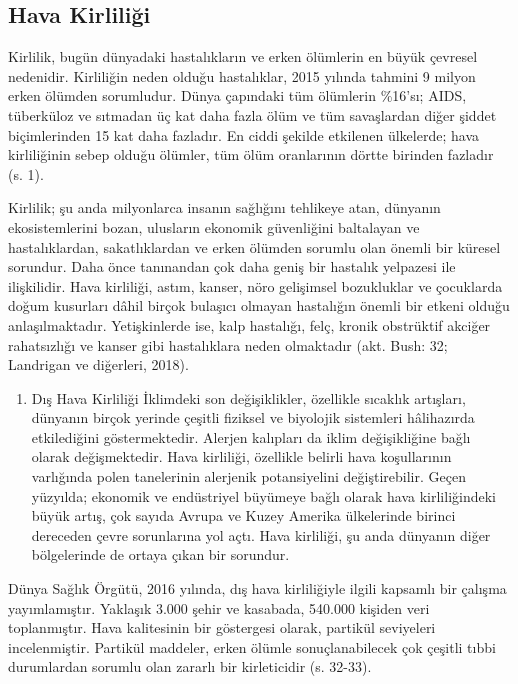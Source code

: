 \documentclass[
]{book}
\providecommand{\tightlist}{%
  \setlength{\itemsep}{0pt}\setlength{\parskip}{0pt}}
\begin{document}
\hypertarget{hava-kirliliux11fi}{%
\subsection{Hava Kirliliği}\label{hava-kirliliux11fi}}

Kirlilik, bugün dünyadaki hastalıkların ve erken ölümlerin en büyük çevresel nedenidir. Kirliliğin neden olduğu hastalıklar, 2015 yılında tahmini 9 milyon erken ölümden sorumludur. Dünya çapındaki tüm ölümlerin \%16'sı; AIDS, tüberküloz ve sıtmadan üç kat daha fazla ölüm ve tüm savaşlardan diğer şiddet biçimlerinden 15 kat daha fazladır. En ciddi şekilde etkilenen ülkelerde; hava kirliliğinin sebep olduğu ölümler, tüm ölüm oranlarının dörtte birinden fazladır (s. 1). \citep{landrigan2018lancet}

Kirlilik; şu anda milyonlarca insanın sağlığını tehlikeye atan, dünyanın ekosistemlerini bozan, ulusların ekonomik güvenliğini baltalayan ve hastalıklardan, sakatlıklardan ve erken ölümden sorumlu olan önemli bir küresel sorundur. Daha önce tanınandan çok daha geniş bir hastalık yelpazesi ile ilişkilidir. Hava kirliliği, astım, kanser, nöro gelişimsel bozukluklar ve çocuklarda doğum kusurları dâhil birçok bulaşıcı olmayan hastalığın önemli bir etkeni olduğu anlaşılmaktadır. Yetişkinlerde ise, kalp hastalığı, felç, kronik obstrüktif akciğer rahatsızlığı ve kanser gibi hastalıklara neden olmaktadır (akt. Bush: 32; Landrigan ve diğerleri, 2018). \citep[akt][]{bush2020, landrigan2018lancet}

\begin{enumerate}
\def\labelenumi{\arabic{enumi})}
\tightlist
\item
  Dış Hava Kirliliği
  İklimdeki son değişiklikler, özellikle sıcaklık artışları, dünyanın birçok yerinde çeşitli fiziksel ve biyolojik sistemleri hâlihazırda etkilediğini göstermektedir. Alerjen kalıpları da iklim değişikliğine bağlı olarak değişmektedir. Hava kirliliği, özellikle belirli hava koşullarının varlığında polen tanelerinin alerjenik potansiyelini değiştirebilir. Geçen yüzyılda; ekonomik ve endüstriyel büyümeye bağlı olarak hava kirliliğindeki büyük artış, çok sayıda Avrupa ve Kuzey Amerika ülkelerinde birinci dereceden çevre sorunlarına yol açtı. Hava kirliliği, şu anda dünyanın diğer bölgelerinde de ortaya çıkan bir sorundur. \citep{damato2014climate}
\end{enumerate}

Dünya Sağlık Örgütü, 2016 yılında, dış hava kirliliğiyle ilgili kapsamlı bir çalışma yayımlamıştır. Yaklaşık 3.000 şehir ve kasabada, 540.000 kişiden veri toplanmıştır. Hava kalitesinin bir göstergesi olarak, partikül seviyeleri incelenmiştir. Partikül maddeler, erken ölümle sonuçlanabilecek çok çeşitli tıbbi durumlardan sorumlu olan zararlı bir kirleticidir (s. 32-33). \citep{bush2020}
\end{document}
